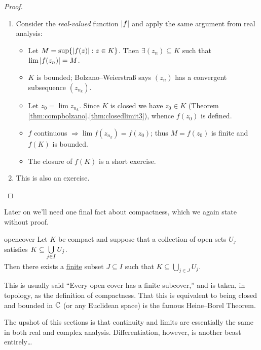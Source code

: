 \begin{proof}{}{}
	\begin{enumerate}
	  \item Consider the \emph{real-valued} function $\left| f\right|$ and apply the same argument from real analysis:
		\begin{itemize}\itemsep0pt
		  \item Let $M=\sup\{\left| f(z)\right|:z\in K\}$. Then $\exists (z_n)\subseteq K$ such that $\lim\left| f(z_n)\right| =M$.
		  \item $K$ is bounded; Bolzano--Weierstraß says $(z_n)$ has a convergent subsequence $(z_{n_k})$.
		  \item Let $z_0=\lim z_{n_k}$. Since $K$ is closed we have $z_0\in K$ (Theorem \ref*{thm:compbolzano}.\ref{thm:closedlimit3}), whence $f(z_0)$ is defined.
		  \item $f$ continuous $\Longrightarrow\lim f(z_{n_k})= f(z_0)$; thus $M=f(z_0)$ is finite and $f(K)$ is bounded.
		  \item The closure of $f(K)$ is a short exercise.
		\end{itemize}
		\item This is also an exercise.\qedhere
	\end{enumerate}
\end{proof}

\goodbreak

Later on we'll need one final fact about compactness, which we again state without proof.

\begin{thm}{}{opencover}
	Let $K$ be compact and suppose that a collection of open sets $U_j$ satisfies $K\subseteq \smash[b]{\bigcup\limits_{j\in I} U_j}$.\par
	Then there exists a \underline{finite} subset $J\subseteq I$ such that $K\subseteq \bigcup\limits_{j\in J} U_j$.
\end{thm}

This is usually said ``Every open cover has a finite subcover,'' and is taken, in topology, as the definition of compactness. That this is equivalent to being closed and bounded in $\mathbb{C}$ (or any Euclidean space) is the famous Heine--Borel Theorem.\smallbreak

The upshot of this sections is that continuity and limits are essentially the same in both real and complex analysis. Differentiation, however, is another beast entirely\ldots



